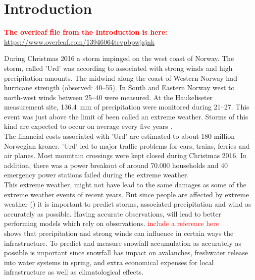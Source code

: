 \chapter{Introduction}
\label{ch:intro}
\textcolor{red}{\textbf{The overleaf file from the Introduction is here:} \\ \url{https://www.overleaf.com/13946064tcvpbpwjzjnk}}

During Christmas 2016 a storm impinged on the west coast of Norway. The storm, called 'Urd' was according to \cite{olsen_ekstremvaerrapport._2017} associated with strong winds and high precipitation amounts. The midwind along the coast of Western Norway had hurricane strength (observed: \SIrange{40}{55}{\mPs}). In South and Eastern Norway west to north-west winds between \SIrange{25}{40}{\mPs} were measured. At the Haukeliseter measurement site, \SI{136.4}{\milli\metre} of precipitation were monitored during \SIrange{21}{27}{\dec}.
This event was just above the limit of been called an extreme weather. Storms of this kind are expected to occur on average every five years \citep{olsen_ekstremvaerrapport._2017}. \\ 
The financial costs associated with 'Urd' are estimated to about 180 million Norwegian kroner.
'Urd' led to major traffic problems for cars, trains, ferries and air planes. Most mountain crossings were kept closed during Christmas 2016. 
In addition, there was a power breakout of around 70.000 households and 40 emergency power stations failed during the extreme weather. 
\\
This extreme weather, might not have lead to the same damages as some of the extreme weather events of recent years. But since people are affected by extreme weather () it is important to predict storms, associated precipitation and wind as accurately as possible. Having accurate observations, will lead to better performing models which rely on observations. \textcolor{red}{include a reference here}\\

 shows that precipitation and strong winds can influence in certain ways the infrastructure. To predict and measure snowfall accumulation as accurately as possible is important since snowfall has impact on avalanches, freshwater release into water systems in spring, and extra economical expenses for local infrastructure as well as climatological effects. \\
